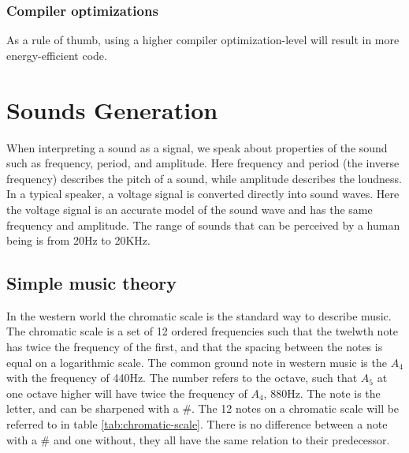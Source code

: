 \subsubsection{Compiler optimizations}
As a rule of thumb, using a higher compiler optimization-level will result in more energy-efficient code.


%


\section{Sounds Generation}\label{sec:sound-generation}
When interpreting a sound as a signal, we speak about properties of the sound such as frequency, period, and amplitude. Here frequency and period (the inverse frequency) describes the pitch of a sound, while amplitude describes the loudness. In a typical speaker, a voltage signal is converted directly into sound waves. Here the voltage signal is an accurate model of the sound wave and has the same frequency and amplitude. The range of sounds that can be perceived by a human being is from 20Hz to 20KHz.\cite{compendium}

\subsection{Simple music theory}
In the western world the chromatic scale is the standard way to describe music. The chromatic scale is a set of 12 ordered frequencies such that the twelwth note has twice the frequency of the first, and that the spacing between the notes is equal on a logarithmic scale. The common ground note in western music is the $A_{4}$ with the frequency of 440Hz. The number refers to the octave, such that $A_{5}$ at one octave higher will have twice the frequency of $A_{4}$, 880Hz. The note is the letter, and can be sharpened with a \#. The 12 notes on a chromatic scale will be referred to in table \ref{tab:chromatic-scale}. There is no difference between a note with a \# and one without, they all have the same relation to their predecessor.

